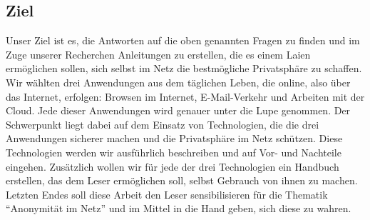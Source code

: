 \subsection{Ziel}
Unser Ziel ist es, die Antworten auf die oben genannten Fragen zu finden und im Zuge unserer Recherchen Anleitungen zu erstellen, die es einem Laien ermöglichen sollen, sich selbst im Netz die bestmögliche Privatsphäre zu schaffen. Wir wählten drei Anwendungen aus dem täglichen Leben, die online, also über das Internet, erfolgen: Browsen im Internet, E-Mail-Verkehr und Arbeiten mit der Cloud. Jede dieser Anwendungen wird genauer unter die Lupe genommen. Der Schwerpunkt liegt dabei auf dem Einsatz von Technologien, die die drei Anwendungen sicherer machen und die Privatsphäre im Netz schützen. Diese Technologien werden wir ausführlich beschreiben und auf Vor- und Nachteile eingehen. Zusätzlich wollen wir für jede der drei Technologien ein Handbuch erstellen, das dem Leser ermöglichen soll, selbst Gebrauch von ihnen zu machen.  Letzten Endes soll diese Arbeit den Leser sensibilisieren für die Thematik ``Anonymität im Netz'' und im Mittel in die Hand geben, sich diese zu wahren.
